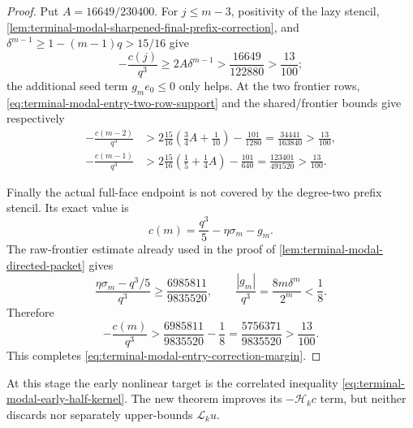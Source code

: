 \begin{proof}
Put $A=16649/230400$.  For $j\le m-3$, positivity of the lazy stencil,
\cref{lem:terminal-modal-sharpened-final-prefix-correction}, and
$\delta^{m-1}\ge1-(m-1)q>15/16$ give
\begin{equation}
 -\frac{c(j)}{q^3}
 \ge2A\delta^{m-1}
 >\frac{16649}{122880}>\frac{13}{100};
 \label{eq:terminal-modal-entry-interior-margin}
\end{equation}
the additional seed term $g_m e_0\le0$ only helps.  At the two frontier
rows, \eqref{eq:terminal-modal-entry-two-row-support} and the shared/frontier
bounds give respectively
\begin{align}
 -\frac{c(m-2)}{q^3}
 &>2\frac{15}{16}\left(\frac34A+\frac1{10}\right)
     -\frac{101}{1280}
 =\frac{34441}{163840}>\frac{13}{100},
 \label{eq:terminal-modal-entry-penultimate-margin}\\
 -\frac{c(m-1)}{q^3}
 &>2\frac{15}{16}\left(\frac15+\frac14A\right)
     -\frac{101}{640}
 =\frac{123401}{491520}>\frac{13}{100}.
 \label{eq:terminal-modal-entry-frontier-margin}
\end{align}

Finally the actual full-face endpoint is not covered by the degree-two
prefix stencil.  Its exact value is
\begin{equation}
 c(m)=\frac{q^3}{5}-\eta\sigma_m-g_m.
\end{equation}
The raw-frontier estimate already used in the proof of
\cref{lem:terminal-modal-directed-packet} gives
\[
 \frac{\eta\sigma_m-q^3/5}{q^3}
 \ge\frac{6985811}{9835520},
 \qquad
 \frac{|g_m|}{q^3}=\frac{8m\delta^m}{2^m}<\frac18.
\]
Therefore
\begin{equation}
 -\frac{c(m)}{q^3}>
 \frac{6985811}{9835520}-\frac18
 =\frac{5756371}{9835520}>\frac{13}{100}.
\end{equation}
This completes \eqref{eq:terminal-modal-entry-correction-margin}.
\end{proof}

At this stage the early nonlinear target is the correlated inequality
\eqref{eq:terminal-modal-early-half-kernel}.  The new theorem improves its
$-\mathcal H_kc$ term, but neither discards nor separately upper-bounds
$\mathcal L_ku$.

